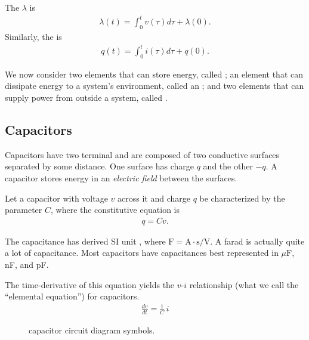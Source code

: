 \documentclass[dynamic_systems.tex]{subfiles}
\begin{document}
The  $\lambda$ is 
\begin{align}
	\lambda(t) = \int_0^t v(\tau) d\tau + \lambda{(0)}.
\end{align}
Similarly, the  is
\begin{align}
	q(t) = \int_0^t i(\tau) d\tau + q(0).
\end{align}

We now consider two elements that can store energy, called ; an element that can dissipate energy to a system's environment, called an ; and two elements that can supply power from outside a system, called .
\tags{}

\subsection{Capacitors}

Capacitors have two terminal and are composed of two conductive surfaces separated by some distance.
One surface has charge $q$ and the other $-q$.
A capacitor stores energy in an \emph{electric field} between the surfaces.
\tags{}

Let a capacitor with voltage $v$ across it and charge $q$ be characterized by the parameter  $C$, where the constitutive equation is
\begin{align}
  q = C v.
\end{align}

The capacitance has derived SI unit , where $\text{F} = \text{A}\cdot\text{s}/\text{V}$.
A farad is actually quite a lot of capacitance.
Most capacitors have capacitances best represented in $\mu\text{F}$, nF, and pF.

The time-derivative of this equation yields the $v$-$i$ relationship (what we call the ``elemental equation'') for capacitors.
\begin{align}
  \frac{d v}{d t} = \frac{1}{C}\, i
\end{align}

\begin{figure}[b]%
  \centering
  \qquad
  \caption{capacitor circuit diagram symbols.}%
  \label{fig:capacitors}%
\end{figure}
\end{document}
